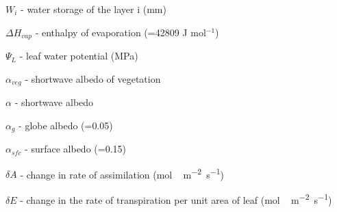 {\begin{description}
\item $W_{i}$  -  water storage of the layer i (\unit{mm}) 
\item $\Delta H_{vap}$  -  enthalpy of evaporation (=42809 J mol$^{-1}$) 
\item $\Psi_{L}$  -  leaf water potential (\unit{MPa}) 
\item $\alpha _{veg}$  -     shortwave albedo of vegetation
\item $\alpha$  -  shortwave albedo 
\item $\alpha_{g}$  -  globe albedo (=0.05) 
\item $\alpha_{sfc}$  -  surface albedo (=0.15) 
\item $\delta{A}$  -  change in rate of assimilation (\unit{mol\,m^{-2}s^{-1}}) 
\item $\delta{E}$  -  change in the rate of transpiration per unit area of leaf (\unit{mol\,m^{-2}s^{-1}})

\end{description}}
